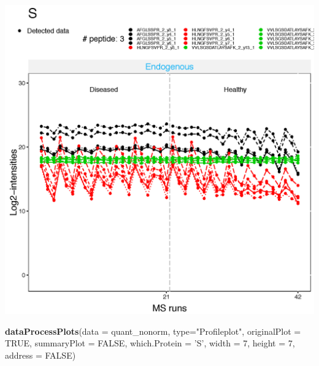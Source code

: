 \documentclass[]{book}
\newenvironment{Shaded}{\begin{snugshade}}{\end{snugshade}}
\newcommand{\DataTypeTok}[1]{\textcolor[rgb]{0.13,0.29,0.53}{#1}}
\newcommand{\DecValTok}[1]{\textcolor[rgb]{0.00,0.00,0.81}{#1}}
\newcommand{\KeywordTok}[1]{\textcolor[rgb]{0.13,0.29,0.53}{\textbf{#1}}}
\newcommand{\NormalTok}[1]{#1}
\newcommand{\OtherTok}[1]{\textcolor[rgb]{0.56,0.35,0.01}{#1}}
\newcommand{\StringTok}[1]{\textcolor[rgb]{0.31,0.60,0.02}{#1}}
\begin{document}
\includegraphics{img/MSstats_ProfilePlot_S.png}

\begin{Shaded}
\begin{Highlighting}[]
\KeywordTok{dataProcessPlots}\NormalTok{(}\DataTypeTok{data =}\NormalTok{ quant_nonorm, }\DataTypeTok{type=}\StringTok{"Profileplot"}\NormalTok{, }
                \DataTypeTok{originalPlot =} \OtherTok{TRUE}\NormalTok{, }\DataTypeTok{summaryPlot =} \OtherTok{FALSE}\NormalTok{,}
                \DataTypeTok{which.Protein =} \StringTok{'S'}\NormalTok{,}
                 \DataTypeTok{width =} \DecValTok{7}\NormalTok{, }\DataTypeTok{height =} \DecValTok{7}\NormalTok{, }\DataTypeTok{address =} \OtherTok{FALSE}\NormalTok{)}
\end{Highlighting}
\end{Shaded}
\end{document}
